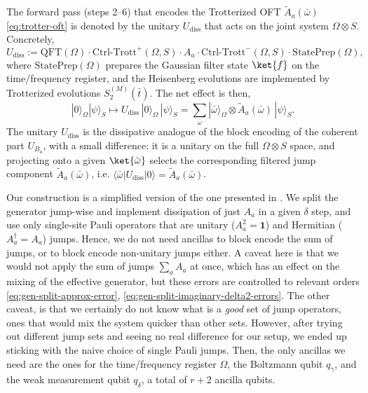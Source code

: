 The forward pass (steps 2--6) that encodes the Trotterized OFT $\tilde{A}_a(\bar{\omega})$ \eqref{eq:trotter-oft} is denoted by the unitary $U_\mathrm{diss}$ that acts on the joint system $\Omega \otimes S$. Concretely, 
\begin{equation}
    U_{\mathrm{diss}} := \mathrm{QFT}(\Omega) \cdot \mathrm{Ctrl\text{-}Trott}^+(\Omega, S) \cdot A_a \cdot \mathrm{Ctrl\text{-}Trott}^-(\Omega, S) \cdot \mathrm{StatePrep}(\Omega),
\end{equation}
where $\mathrm{StatePrep}(\Omega)$ prepares the Gaussian filter state $\ket{f}$ on the time/frequency register, and the Heisenberg evolutions are implemented by Trotterized evolutions $S_2^{(M)}(\bar t)$. The net effect is then, 
\begin{equation}
    |0\rangle_\Omega |\psi\rangle_S \mapsto U_{\mathrm{diss}}\,|0\rangle_\Omega\,|\psi\rangle_S = \sum_{\bar\omega} |\bar\omega\rangle_\Omega \otimes \tilde{A}_a(\bar\omega)\,|\psi\rangle_S.
\end{equation}
The unitary $U_\mathrm{diss}$ is the dissipative analogue of the block encoding of the coherent part $U_{B_a}$, with a small difference: it is a unitary on the full $\Omega \otimes S$ space, and projecting onto a given $\ket{\bar{\omega}}$ selects the corresponding filtered jump component $\tilde{A}_a(\bar{\omega})$, i.e. $\langle \bar\omega|U_{\mathrm{diss}}|0\rangle = \tilde{A}_a(\bar\omega)$. 

Our construction is a simplified version of the one presented in \cite{chen2023quantum}. We split the generator jump-wise and implement dissipation of just $A_a$ in a given $\delta$ step, and use only single-site Pauli operators that are unitary ($A^2_a = \mathbf{1}$) and Hermitian ($A_a^\dagger = A_a$) jumps. Hence, we  do not need ancillas to block encode the sum of jumps, or to block encode non-unitary jumps either. A caveat here is that we would not apply the sum of jumps $\sum_a A_a$ at once, which has an effect on the mixing of the effective generator, but these errors are controlled to relevant orders \eqref{eq:gen-split-approx-error}, \eqref{eq:gen-split-imaginary-delta2-errors}. The other caveat, is that we certainly do not know what is a \emph{good} set of jump operators, ones that would mix the system quicker than other sets. However, after trying out different jump sets and seeing no real difference for our setup, we ended up sticking with the naive choice of single Pauli jumps. Then, the only ancillas we need are the ones for the time/frequency register $\Omega$, the Boltzmann qubit $q_\gamma$, and the weak measurement qubit $q_\delta$, a total of $r+2$ ancilla qubits.

